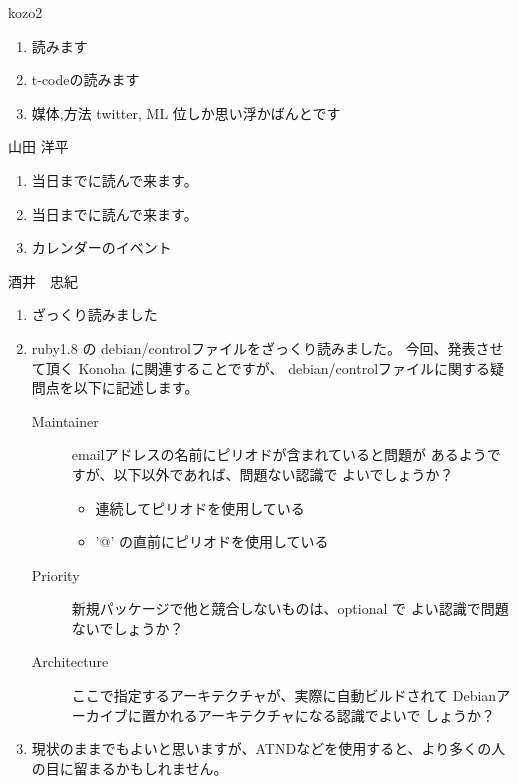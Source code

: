 \documentclass[mingoth,a4paper]{jsarticle}
\begin{document}
\begin{prework}{ kozo2 }
  \begin{enumerate}
  \item 読みます
  \item t-codeの読みます
  \item 媒体,方法 twitter, ML 位しか思い浮かばんとです
  \end{enumerate}
\end{prework}

\begin{prework}{ 山田 洋平 }
  \begin{enumerate}
  \item 当日までに読んで来ます。
  \item 当日までに読んで来ます。
  \item カレンダーのイベント
  \end{enumerate}
\end{prework}

\begin{prework}{ 酒井　忠紀 }
  \begin{enumerate}
  \item ざっくり読みました
  \item ruby1.8 の debian/controlファイルをざっくり読みました。
    今回、発表させて頂く Konoha に関連することですが、
    debian/controlファイルに関する疑問点を以下に記述します。
    \begin{description}
    \item[Maintainer]
      emailアドレスの名前にピリオドが含まれていると問題が
      あるようですが、以下以外であれば、問題ない認識で
      よいでしょうか？
      \begin{itemize}
      \item 連続してピリオドを使用している
      \item '@' の直前にピリオドを使用している
      \end{itemize}
    \item[Priority]
      新規パッケージで他と競合しないものは、optional で
      よい認識で問題ないでしょうか？
    \item[Architecture]
      ここで指定するアーキテクチャが、実際に自動ビルドされて
      Debianアーカイブに置かれるアーキテクチャになる認識でよいで
      しょうか？
    \end{description}
  \item 現状のままでもよいと思いますが、ATNDなどを使用すると、より多くの人の目に留まるかもしれません。
  \end{enumerate}
\end{prework}
\end{document}
